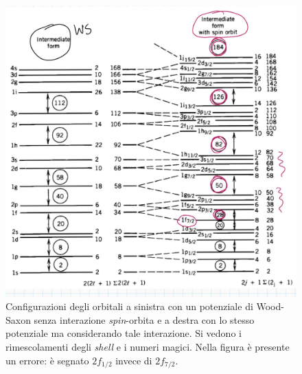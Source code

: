 \begin{figure}[h]
    \centering
    \includegraphics[scale=0.3]{Immagini/shell2.png}
    \caption{Configurazioni degli orbitali a sinistra con un potenziale di Wood-Saxon senza interazione \textit{spin}-orbita e a destra con lo stesso potenziale ma considerando tale interazione. Si vedono i rimescolamenti degli \textit{shell} e i numeri magici. Nella figura è presente un errore: è segnato $2f_{1/2}$ invece di $2f_{7/2}$.}
    \label{shellmix}
\end{figure}

